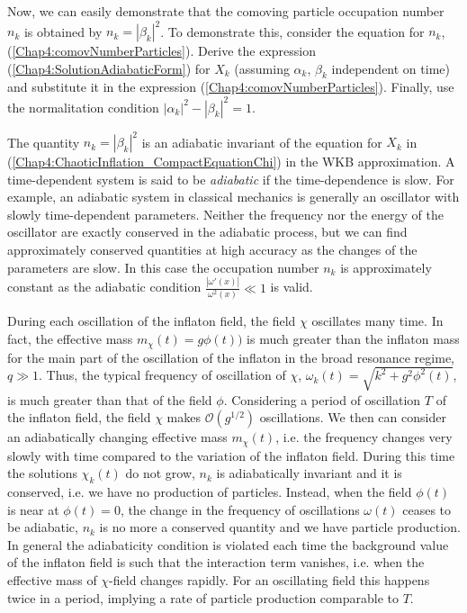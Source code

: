 \documentclass[11pt,a4paper,twoside]{book}
\begin{document}
Now, we can easily demonstrate that the comoving particle occupation number $ n_{k} $ is obtained by $ n_{k}=|\beta_{k}|^{2} $. To demonstrate this, consider the equation for $ n_{k} $, (\ref{Chap4:comovNumberParticles}). Derive the expression (\ref{Chap4:SolutionAdiabaticForm}) for $ X_{k} $ (assuming $ \alpha_{k} $, $\beta_{k}$ independent on time) and substitute it in the expression (\ref{Chap4:comovNumberParticles}). Finally, use the normalitation condition  $ |\alpha_{k}|^{2} - |\beta_{k}|^{2} = 1 $.

The quantity $ n_{k}=|\beta_{k}|^{2} $ is an adiabatic invariant of the equation for $ X_{k} $ in (\ref{Chap4:ChaoticInflation_CompactEquationChi}) in the WKB approximation. A time-dependent system  is said to be \textit{adiabatic} if the time-dependence is slow. For example, an adiabatic system in classical mechanics is generally an oscillator with slowly time-dependent parameters. Neither the frequency nor the energy of the oscillator are exactly conserved in the adiabatic process, but we can find approximately conserved quantities at high accuracy as the changes of the parameters are slow. In this case the occupation number $ n_{k} $ is approximately constant as the adiabatic condition $ \frac{|\omega'(x)|}{\omega^{2}(x)} \ll 1 $ is valid. 

During each oscillation of the inflaton field, the field $ \chi $ oscillates many time. In fact, the effective mass $ m_{\chi}(t) = g\phi(t)) $ is much greater than the inflaton mass for the main part of the oscillation of the inflaton in the broad resonance regime, $ q \gg  1$. Thus, the typical frequency of oscillation of $ \chi $, $\omega_{k}(t) = \sqrt{k^{2} + g^{2}\phi^{2}(t)}$, is much greater than that of the field $\phi$. Considering a period of oscillation $ T $ of the inflaton field, the field $ \chi $ makes $\mathcal{O}(g^{1/2})$ oscillations. We then can consider an adiabatically changing effective mass $ m_{\chi}(t) $, i.e. the frequency changes very slowly with time compared to the variation of the inflaton field. During this time the solutions $\chi_{k}(t)$ do not grow, $ n_{k} $ is  adiabatically invariant and it is conserved, i.e. we have no production of particles. Instead, when the field $ \phi(t) $ is near at $ \phi(t)=0 $, the change in the frequency of oscillations $ \omega(t) $ ceases to be adiabatic, $ n_{k} $ is no more a conserved quantity and we have particle production. In general the adiabaticity condition is violated each time the background value of the inflaton field is such that the interaction term vanishes, i.e. when the effective mass of $\chi$-field changes rapidly. For an oscillating field this happens twice in a period, implying a rate of particle production comparable to $ T. $
\end{document}

